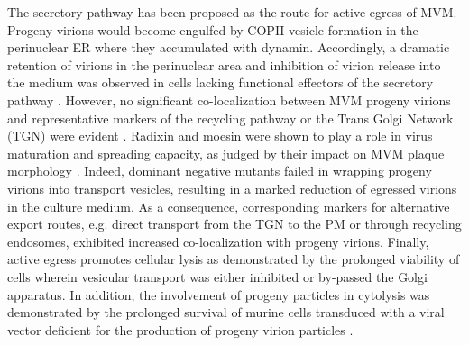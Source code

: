 The secretory pathway has been proposed as the route for active egress of MVM. Progeny virions would become engulfed by COPII-vesicle formation in the perinuclear ER where they accumulated with dynamin. Accordingly, a dramatic retention of virions in the perinuclear area and inhibition of virion release into the medium was observed in cells lacking functional effectors of the secretory pathway \cite{pmid24068925}. However, no significant co-localization between MVM progeny virions and representative markers of the recycling pathway or the Trans Golgi Network (TGN) were evident \cite{pmid24068925}. Radixin and moesin were shown to play a role in virus maturation and spreading capacity, as judged by their impact on MVM plaque morphology \cite{pmid19321616}. Indeed, dominant negative mutants failed in wrapping progeny virions into transport vesicles, resulting in a marked reduction of egressed virions in the culture medium. As a consequence, corresponding markers for alternative export routes, e.g. direct transport from the TGN to the PM or through recycling endosomes, exhibited increased co-localization with progeny virions. Finally, active egress promotes cellular lysis as demonstrated by the prolonged viability of cells wherein vesicular transport was either inhibited or by-passed the Golgi apparatus. In addition, the involvement of progeny particles in cytolysis was demonstrated by the prolonged survival of murine cells transduced with a viral vector deficient for the production of progeny virion particles \cite{pmid24068925}.  
\label{Egress1}



  



